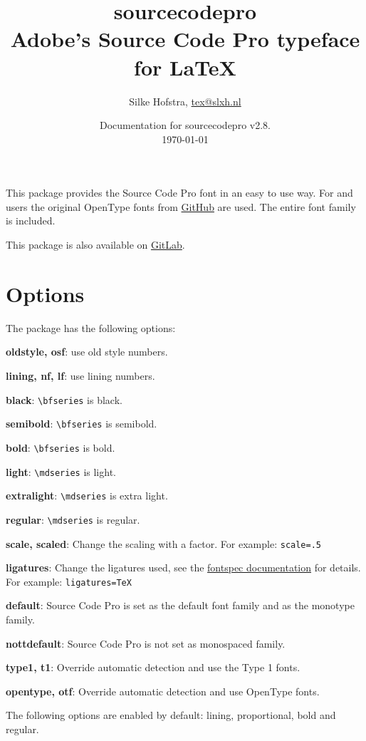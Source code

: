 \documentclass[10pt,a4paper,english]{article}
\title{\bfseries
	\Huge sourcecodepro\\
	\Large Adobe's Source Code Pro typeface for \LaTeX
}
\author{Silke Hofstra, \href{mailto:tex@slxh.nl}{tex@slxh.nl}}
\date{Documentation for sourcecodepro v2.8.\\ \today}
\begin{document}
\maketitle
\begin{multicols}{2}
This package provides the Source Code Pro font in an easy to use way. For  and  users the original OpenType fonts from \href{https://github.com/adobe-fonts/source-code-pro}{GitHub} are used. The entire font family is included.

This package is also available on \href{https://gitlab.com/slxh/latex/sourcecodepro}{GitLab}.

\section{Options}
The package has the following options:
\begin{itemize*}
	\item \textbf{oldstyle, osf}:  use old style numbers.
	\item \textbf{lining, nf, lf}: use lining numbers.
	\item \textbf{black}:          \texttt{\textbackslash bfseries} is black.
	\item \textbf{semibold}:       \texttt{\textbackslash bfseries} is semibold.
	\item \textbf{bold}:           \texttt{\textbackslash bfseries} is bold.
	\item \textbf{light}:          \texttt{\textbackslash mdseries} is light.
	\item \textbf{extralight}:     \texttt{\textbackslash mdseries} is extra light.
	\item \textbf{regular}:        \texttt{\textbackslash mdseries} is regular.
	\item \textbf{scale, scaled}:  Change the scaling with a factor. For example: \texttt{scale=.5}
	\item \textbf{ligatures}:      Change the ligatures used,
                                   see the \href{http://mirrors.ctan.org/macros/latex/contrib/fontspec/fontspec.pdf}{fontspec documentation} for details.
								   For example: \texttt{ligatures=TeX}
	\item \textbf{default}:        Source Code Pro is set as the default font family and as the monotype family.
	\item \textbf{nottdefault}:    Source Code Pro is not set as monospaced family.
	\item \textbf{type1, t1}:      Override automatic detection and use the Type 1 fonts.
	\item \textbf{opentype, otf}:  Override automatic detection and use OpenType fonts.
\end{itemize*}
The following options are enabled by default: lining, proportional, bold and regular.


\end{multicols}
\end{document}
